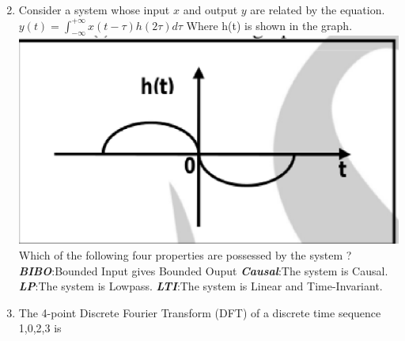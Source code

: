 \documentclass[journal,12pt,twocolumn]{IEEEtran}
\begin{document}
\begin{enumerate}
\begin{enumerate}[(A)]
\begin{multicols}{2}
\end{multicols}
\end{enumerate}

\item Consider a system whose input $x$ and output $y$ are related by the equation. 
\newline$y(t)=\int_{-\infty}^{+\infty}x(t-\tau)h(2\tau)d\tau$
Where h(t) is shown in the graph.\\
\includegraphics[scale=0.4]{fig9.eps}
\newline Which of the following four properties are possessed by the system ?
\newline \textbf{\textit{BIBO}}:Bounded Input gives Bounded Ouput
\newline \textbf{\textit{Causal}}:The system is Causal.
\newline \textbf{\textit{LP}}:The system is Lowpass.
\newline \textbf{\textit{LTI}}:The system is Linear and Time-Invariant.\\
\begin{enumerate}[(A)]
\end{enumerate}

\item The 4-point Discrete Fourier Transform (DFT) of a discrete time sequence {1,0,2,3} is\\
\begin{enumerate}[(A)]


\end{enumerate}
\end{enumerate}
\end{document}

